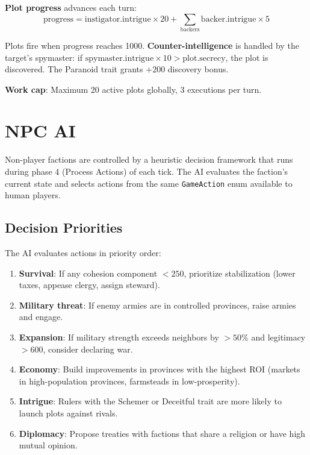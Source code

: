 \documentclass[a4paper, 11pt]{article}
\begin{document}
\textbf{Plot progress} advances each turn:
\begin{equation}
  \text{progress} = \text{instigator.intrigue} \times 20 + \sum_{\text{backers}} \text{backer.intrigue} \times 5
\end{equation}

Plots fire when progress reaches 1000. \textbf{Counter-intelligence} is handled by
the target's spymaster: if $\text{spymaster.intrigue} \times 10 >
\text{plot.secrecy}$, the plot is discovered. The Paranoid trait grants $+200$
discovery bonus.

\textbf{Work cap}: Maximum 20 active plots globally, 3 executions per turn.


\section{NPC AI}
\label{sec:ai}

Non-player factions are controlled by a heuristic decision framework that
runs during phase 4 (Process Actions) of each tick. The AI evaluates the
faction's current state and selects actions from the same
\texttt{GameAction} enum available to human players.

\subsection{Decision Priorities}

The AI evaluates actions in priority order:

\begin{enumerate}
  \item \textbf{Survival}: If any cohesion component $< 250$, prioritize
    stabilization (lower taxes, appease clergy, assign steward).
  \item \textbf{Military threat}: If enemy armies are in controlled provinces,
    raise armies and engage.
  \item \textbf{Expansion}: If military strength exceeds neighbors by $> 50\%$
    and legitimacy $> 600$, consider declaring war.
  \item \textbf{Economy}: Build improvements in provinces with the highest
    ROI (markets in high-population provinces, farmsteads in low-prosperity).
  \item \textbf{Intrigue}: Rulers with the Schemer or Deceitful trait are more
    likely to launch plots against rivals.
  \item \textbf{Diplomacy}: Propose treaties with factions that share a
    religion or have high mutual opinion.
\end{enumerate}
\end{document}
